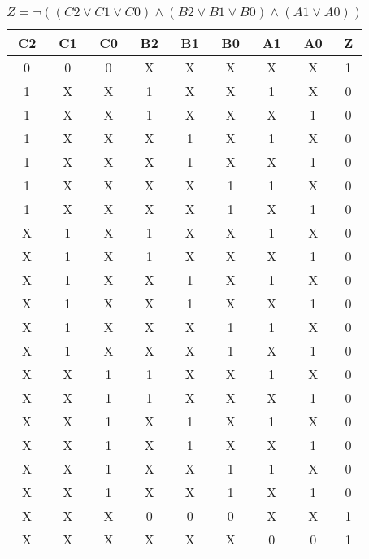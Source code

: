 \begin{center}
    \begin{table}[h] \caption{\(Z = \lnot ((C2 \lor C1 \lor C0) \land (B2 \lor B1 \lor B0) \land (A1 \lor A0)) \)}
        \begin{center}
            \begin{tabular}{|c|c|c|c|c|c|c|c||c|} \hline
            C2 & C1 & C0 & B2 & B1 & B0 & A1 & A0 & Z \\ \hline\hline
            0  & 0  & 0  & X  & X  & X  & X  & X  & 1 \\ \hline
            1  & X  & X  & 1  & X  & X  & 1  & X  & 0 \\ \hline
            1  & X  & X  & 1  & X  & X  & X  & 1  & 0 \\ \hline
            1  & X  & X  & X  & 1  & X  & 1  & X  & 0 \\ \hline
            1  & X  & X  & X  & 1  & X  & X  & 1  & 0 \\ \hline
            1  & X  & X  & X  & X  & 1  & 1  & X  & 0 \\ \hline
            1  & X  & X  & X  & X  & 1  & X  & 1  & 0 \\ \hline
            X  & 1  & X  & 1  & X  & X  & 1  & X  & 0 \\ \hline
            X  & 1  & X  & 1  & X  & X  & X  & 1  & 0 \\ \hline
            X  & 1  & X  & X  & 1  & X  & 1  & X  & 0 \\ \hline
            X  & 1  & X  & X  & 1  & X  & X  & 1  & 0 \\ \hline
            X  & 1  & X  & X  & X  & 1  & 1  & X  & 0 \\ \hline
            X  & 1  & X  & X  & X  & 1  & X  & 1  & 0 \\ \hline
            X  & X  & 1  & 1  & X  & X  & 1  & X  & 0 \\ \hline
            X  & X  & 1  & 1  & X  & X  & X  & 1  & 0 \\ \hline
            X  & X  & 1  & X  & 1  & X  & 1  & X  & 0 \\ \hline
            X  & X  & 1  & X  & 1  & X  & X  & 1  & 0 \\ \hline
            X  & X  & 1  & X  & X  & 1  & 1  & X  & 0 \\ \hline
            X  & X  & 1  & X  & X  & 1  & X  & 1  & 0 \\ \hline
            X  & X  & X  & 0  & 0  & 0  & X  & X  & 1 \\ \hline
            X  & X  & X  & X  & X  & X  & 0  & 0  & 1 \\ \hline
            \end{tabular}
        \end{center}
    \end{table}
\end{center}

